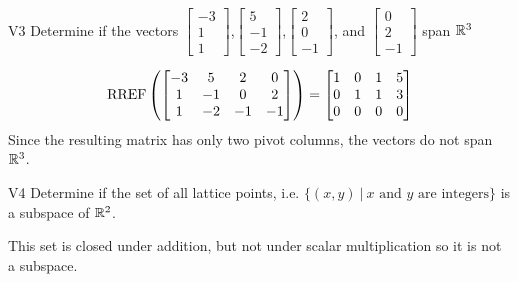\documentclass{sbgLAquiz}
\begin{document}
\begin{problem}{V3}
Determine if the vectors  $\begin{bmatrix} -3 \\ 1 \\ 1 \end{bmatrix}$,$\begin{bmatrix} 5 \\ -1 \\ -2 \end{bmatrix}$,$\begin{bmatrix}2 \\ 0 \\ -1 \end{bmatrix}$, and $\begin{bmatrix} 0 \\ 2 \\ -1\end{bmatrix}$ span $\mathbb{R}^3$
\end{problem}
\begin{solution}
$$\operatorname{RREF}\left(\begin{bmatrix}
-3 & 5 & 2 & 0 \\ 1 & -1 & 0 & 2 \\ 1 & -2 & -1 & -1 \end{bmatrix}\right)=\begin{bmatrix} 1 & 0 & 1 & 5 \\ 0 & 1 & 1 & 3 \\ 0 & 0 & 0 & 0\end{bmatrix}$$
Since the resulting matrix has only two pivot columns, the vectors do not span $\mathbb{R}^3$.
\end{solution}


\begin{extract}\newpage\end{extract}
\begin{problem}{V4}
Determine if the set of all lattice points, i.e. $\{(x,y)\ \big|\ \text{$x$ and $y$ are integers} \}$ is a subspace of $\mathbb{R}^2$.
\end{problem}
\begin{solution}
This set is closed under addition, but not under scalar multiplication so it is not a subspace.
\end{solution}
\end{document}

